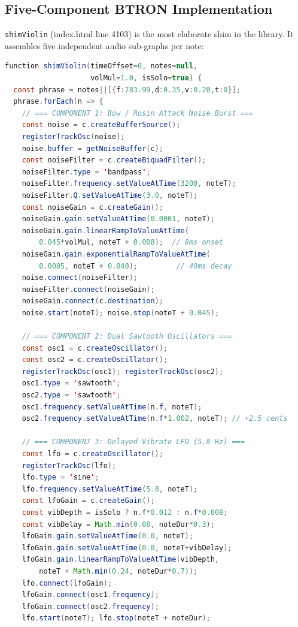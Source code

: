 \documentclass[10pt,journal,compsoc,twocolumn]{article}
\begin{document}
\subsection{Five-Component BTRON Implementation}

\texttt{shimViolin} (index.html line 4103) is the most elaborate shim in
the library.  It assembles five independent audio sub-graphs per note:

\begin{lstlisting}[language=Java,
    caption={\texttt{shimViolin}: complete 5-component teardown (line 4103).},
    label={lst:violin}]
function shimViolin(timeOffset=0, notes=null,
                    volMul=1.0, isSolo=true) {
  const phrase = notes||[{f:783.99,d:0.35,v:0.20,t:0}];
  phrase.forEach(n => {
    // === COMPONENT 1: Bow / Rosin Attack Noise Burst ===
    const noise = c.createBufferSource();
    registerTrackOsc(noise);
    noise.buffer = getNoiseBuffer(c);
    const noiseFilter = c.createBiquadFilter();
    noiseFilter.type = 'bandpass';
    noiseFilter.frequency.setValueAtTime(3200, noteT);
    noiseFilter.Q.setValueAtTime(3.0, noteT);
    const noiseGain = c.createGain();
    noiseGain.gain.setValueAtTime(0.0001, noteT);
    noiseGain.gain.linearRampToValueAtTime(
        0.045*volMul, noteT + 0.008);  // 8ms onset
    noiseGain.gain.exponentialRampToValueAtTime(
        0.0005, noteT + 0.040);         // 40ms decay
    noise.connect(noiseFilter);
    noiseFilter.connect(noiseGain);
    noiseGain.connect(c.destination);
    noise.start(noteT); noise.stop(noteT + 0.045);

    // === COMPONENT 2: Dual Sawtooth Oscillators ===
    const osc1 = c.createOscillator();
    const osc2 = c.createOscillator();
    registerTrackOsc(osc1); registerTrackOsc(osc2);
    osc1.type = 'sawtooth';
    osc2.type = 'sawtooth';
    osc1.frequency.setValueAtTime(n.f, noteT);
    osc2.frequency.setValueAtTime(n.f*1.002, noteT); // +2.5 cents

    // === COMPONENT 3: Delayed Vibrato LFO (5.8 Hz) ===
    const lfo = c.createOscillator();
    registerTrackOsc(lfo);
    lfo.type = 'sine';
    lfo.frequency.setValueAtTime(5.8, noteT);
    const lfoGain = c.createGain();
    const vibDepth = isSolo ? n.f*0.012 : n.f*0.008;
    const vibDelay = Math.min(0.08, noteDur*0.3);
    lfoGain.gain.setValueAtTime(0.0, noteT);
    lfoGain.gain.setValueAtTime(0.0, noteT+vibDelay);
    lfoGain.gain.linearRampToValueAtTime(vibDepth,
        noteT + Math.min(0.24, noteDur*0.7));
    lfo.connect(lfoGain);
    lfoGain.connect(osc1.frequency);
    lfoGain.connect(osc2.frequency);
    lfo.start(noteT); lfo.stop(noteT + noteDur);


\end{lstlisting}
\end{document}
